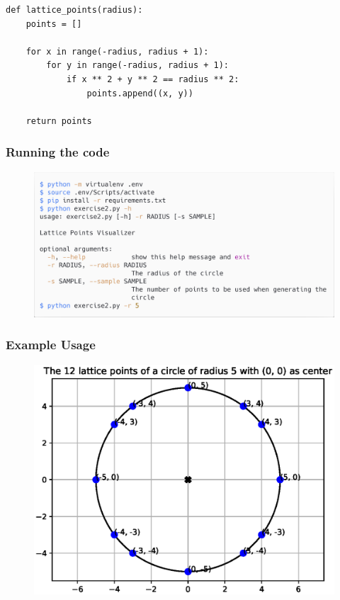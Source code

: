 \documentclass[12pt]{article}
\newenvironment{matlab}
	{\begin{figure}[H]\centering\captionsetup{justification=centering}}
	{\end{figure}}
\begin{document}
\begin{lstlisting}
def lattice_points(radius):
    points = []

    for x in range(-radius, radius + 1):
        for y in range(-radius, radius + 1):
            if x ** 2 + y ** 2 == radius ** 2:
                points.append((x, y))

    return points
\end{lstlisting}

\pagebreak

\subsubsection*{Running the code}

\begin{matlab}
    \includegraphics[scale=0.140]{images/lattice_points.png}
\end{matlab}

\subsubsection*{Example Usage}

\begin{matlab}
    \includegraphics[scale=1]{images/lattice_points.eps}
\end{matlab}
\end{document}
